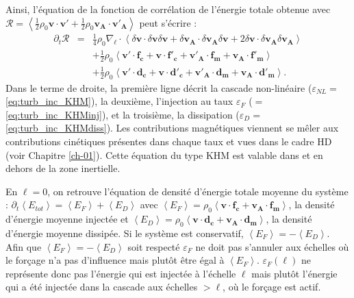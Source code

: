 Ainsi, l'équation de la fonction de corrélation de l'énergie totale obtenue avec $\mathcal{R} = \left<\frac{1}{2} \rho_0 \boldsymbol{v} \cdot \boldsymbol{v'} + \frac{1}{2} \rho_0 \boldsymbol{v_A} \cdot \boldsymbol{v'_A}\right>$ peut s'écrire :
\begin{eqnarray}
\label{eq:turb_inc_KHM}    \partial_t \mathcal{R} &=& \frac{1}{4} \rho_0 \nabla_{\boldsymbol{\ell}} \cdot \left< \delta \boldsymbol{v} \cdot \delta \boldsymbol{v} \delta \boldsymbol{v} + \delta \boldsymbol{v_A} \cdot \delta \boldsymbol{v_A} \delta \boldsymbol{v} + 2 \delta \boldsymbol{v} \cdot \delta \boldsymbol{v_A} \delta \boldsymbol{v_A}\right> \\
 \label{eq:turb_inc_KHMinj}    &&+ \frac{1}{2} \rho_0  \left<\boldsymbol{v'} \cdot \boldsymbol{f_c} + \boldsymbol{v} \cdot \boldsymbol{f'_c} + \boldsymbol{v'_A} \cdot \boldsymbol{f_m} + \boldsymbol{v_A} \cdot \boldsymbol{f'_m}\right> \\
 \label{eq:turb_inc_KHMdiss}    &&+ \frac{1}{2} \rho_0 \left<\boldsymbol{v'} \cdot \boldsymbol{d_c} +\boldsymbol{v} \cdot \boldsymbol{d'_c} + \boldsymbol{v'_A} \cdot \boldsymbol{d_m} + \boldsymbol{v_A} \cdot \boldsymbol{d'_m}\right>.
\end{eqnarray}
Dans le terme de droite, la première ligne décrit la cascade non-linéaire ($\varepsilon_{NL} = $  \eqref{eq:turb_inc_KHM}), la deuxième, l'injection au taux $\varepsilon_F$ ($=$ \eqref{eq:turb_inc_KHMinj}), et la troisième, la dissipation ($\varepsilon_D =$  \eqref{eq:turb_inc_KHMdiss}). Les contributions magnétiques viennent se mêler aux contributions cinétiques présentes dans chaque taux et vues dans le cadre \ac{HD} (voir Chapitre \ref{ch-01}).  Cette équation du type \acs{KHM} est valable dans et en dehors de la zone inertielle. 

En $\boldsymbol{\ell} = 0$, on retrouve l'équation de densité d'énergie totale moyenne du système : $\partial_t \left<E_{tot}\right> = \left<E_F\right> + \left<E_D\right>$ avec $\left<E_F\right> = \rho_0 \left<\boldsymbol{v} \cdot \boldsymbol{f_c} + \boldsymbol{v_A} \cdot \boldsymbol{f_m} \right>$, la densité d'énergie moyenne injectée et $\left<E_D\right> = \rho_0 \left<\boldsymbol{v} \cdot \boldsymbol{d_c} + \boldsymbol{v_A} \cdot \boldsymbol{d_m}\right>$, la densité d'énergie moyenne dissipée. 
Si le système est conservatif, $\left<E_F\right> = -  \left<E_D\right> $. Afin que $\left<E_F\right> = -  \left<E_D\right>$ soit respecté $\varepsilon_F$ ne doit pas s'annuler aux échelles où le forçage n'a pas d'influence mais plutôt être égal à $\left<E_F\right>$. $\varepsilon_F (\ell)$ ne représente donc pas l'énergie qui est injectée à l'échelle $\ell$ mais plutôt l'énergie qui a été injectée dans la cascade aux échelles $>\ell$, où le forçage est actif.

